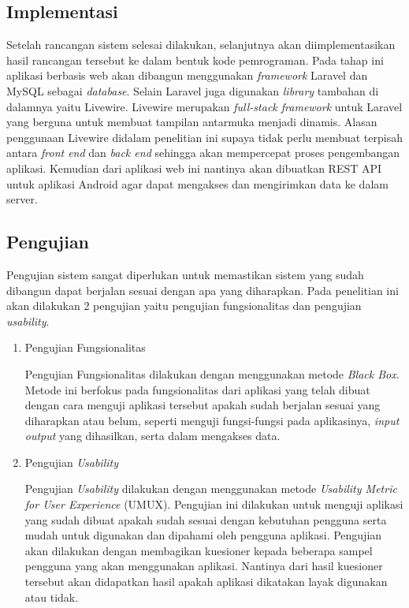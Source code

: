 \subsection{Implementasi}
Setelah rancangan sistem selesai dilakukan, selanjutnya akan diimplementasikan hasil rancangan tersebut ke dalam bentuk kode pemrograman. Pada tahap ini aplikasi berbasis web akan dibangun menggunakan \textit{framework} Laravel dan MySQL sebagai \textit{database}. Selain Laravel juga digunakan \textit{library} tambahan di dalamnya yaitu Livewire. Livewire merupakan \textit{full-stack framework} untuk Laravel yang berguna untuk membuat tampilan antarmuka menjadi dinamis. Alasan penggunaan Livewire didalam penelitian ini supaya tidak perlu membuat terpisah antara \textit{front end} dan \textit{back end} sehingga akan mempercepat proses pengembangan aplikasi. Kemudian dari aplikasi web ini nantinya akan dibuatkan REST API untuk aplikasi Android agar dapat mengakses dan mengirimkan data ke dalam server.

\subsection{Pengujian}
Pengujian sistem sangat diperlukan untuk memastikan sistem yang sudah dibangun dapat berjalan sesuai dengan apa yang diharapkan. Pada penelitian ini akan dilakukan 2 pengujian yaitu pengujian fungsionalitas dan pengujian \textit{usability}.

\begin{enumerate}
\item Pengujian Fungsionalitas
\par Pengujian Fungsionalitas dilakukan dengan menggunakan metode \textit{Black Box}. Metode ini berfokus pada fungsionalitas dari aplikasi yang telah dibuat dengan cara menguji aplikasi tersebut apakah sudah berjalan sesuai yang diharapkan atau belum, seperti menguji fungsi-fungsi pada aplikasinya, \textit{input output} yang dihasilkan, serta dalam mengakses data.
\item Pengujian \textit{Usability}
\par Pengujian \textit{Usability} dilakukan dengan menggunakan metode \textit{Usability Metric for User Experience} (UMUX). Pengujian ini dilakukan untuk menguji aplikasi yang sudah dibuat apakah sudah sesuai dengan kebutuhan pengguna serta mudah untuk digunakan dan dipahami oleh pengguna aplikasi. Pengujian akan dilakukan dengan membagikan kuesioner kepada beberapa sampel pengguna yang akan menggunakan aplikasi. Nantinya dari hasil kuesioner tersebut akan didapatkan hasil apakah aplikasi dikatakan layak digunakan atau tidak. 
\end{enumerate}

